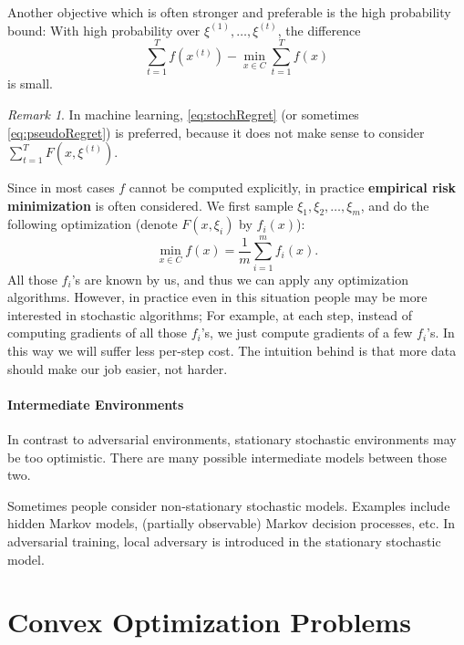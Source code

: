 \documentclass[openany]{book}
\theoremstyle{definition}
\theoremstyle{remark}
\newtheorem*{remark}{Remark}
\begin{document}
Another objective which is often stronger and preferable is the high probability bound: With high probability over $\xi^{(1)},\ldots,\xi^{(t)}$, the difference
\begin{equation}\label{eq:stochRegret}
    \sum_{t=1}^{T}f(x^{(t)})-\min_{x\in C}\sum_{t=1}^{T}f(x)
\end{equation}
is small.
\begin{remark}
    In machine learning, \eqref{eq:stochRegret} (or sometimes \eqref{eq:pseudoRegret}) is preferred, because it does not make sense to consider $\sum_{t=1}^{T}F(x,\xi^{(t)})$.
\end{remark}

Since in most cases $f$ cannot be computed explicitly, in practice \textbf{empirical risk minimization} is often considered. We first sample $\xi_1,\xi_2,\ldots,\xi_m$, and do the following optimization (denote $F(x,\xi_i)$ by $f_i(x)$):
\begin{equation}\label{finiteSum}
    \min_{x\in C}f(x)=\frac{1}{m}\sum_{i=1}^{m}f_i(x).
\end{equation}
All those $f_i$'s are known by us, and thus we can apply any optimization algorithms. However, in practice even in this situation people may be more interested in stochastic algorithms; For example, at each step, instead of computing gradients of all those $f_i$'s, we just compute gradients of a few $f_i$'s. In this way we will suffer less per-step cost. The intuition behind is that more data should make our job easier, not harder.

\paragraph{Intermediate Environments}
In contrast to adversarial environments, stationary stochastic environments may be too optimistic. There are many possible intermediate models between those two.

Sometimes people consider non-stationary stochastic models. Examples include hidden Markov models, (partially observable) Markov decision processes, etc. In adversarial training, local adversary is introduced in the stationary stochastic model.

\section{Convex Optimization Problems}
\end{document}

